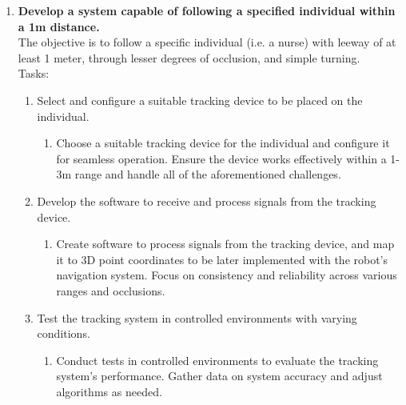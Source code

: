\documentclass{article}
\begin{document}
\begin{enumerate}
\item \textbf{Develop a system capable of following a specified individual within a 1m distance.}\\
The objective is to follow a specific individual (i.e. a nurse) with leeway of at least 1 meter, through lesser degrees of occlusion, and simple turning.\\
Tasks:
\begin{enumerate}
    \item Select and configure a suitable tracking device to be placed on the individual.
    \begin{enumerate}
        \item Choose a suitable tracking device for the individual and configure it for seamless operation. Ensure the device works effectively within a 1-3m range and handle all of the aforementioned challenges.
    \end{enumerate}
    
    \item Develop the software to receive and process signals from the tracking device.
    \begin{enumerate}
        \item Create software to process signals from the tracking device, and map it to 3D point coordinates to be later implemented with the robot’s navigation system. Focus on consistency and reliability across various ranges and occlusions.
    \end{enumerate}
    
    
    \item Test the tracking system in controlled environments with varying conditions.
    \begin{enumerate}
        \item Conduct tests in controlled environments to evaluate the tracking system's performance. Gather data on system accuracy and adjust algorithms as needed.
    \end{enumerate}
    

\end{enumerate}
\end{enumerate}
\end{document}
